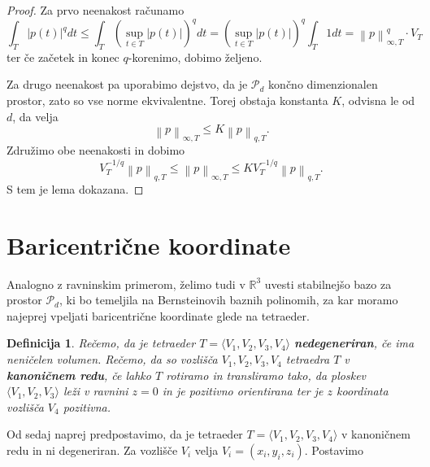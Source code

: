 \documentclass[11pt,a4paper]{article}
\newtheorem{definition}{Definicija}
\newtheorem{theorem}{Izrek}
\begin{document}
\begin{proof}
    Za prvo neenakost računamo
    \begin{equation*}
        \int_{T} |p(t)|^q dt \le 
        \int_{T} \left( \sup_{t \in T} |p(t)| \right) ^q dt
        = \left( \sup_{t \in T} |p(t)| \right)^q \int_{T}1dt
        = \left\lVert p \right\rVert_{\infty , T}^{q} \cdot V_T
    \end{equation*}
    ter če začetek in konec $q$-korenimo, dobimo željeno.

    Za drugo neenakost pa uporabimo dejstvo, da je $\mathcal{P}_d$ končno dimenzionalen prostor, zato so vse norme ekvivalentne. Torej obstaja konstanta $K$, odvisna le od $d$, da velja
    \begin{equation*}
        \left\lVert p \right\rVert_{\infty, T} \leq K \left\lVert p \right\rVert_{q,T}.
    \end{equation*}
    Združimo obe neenakosti in dobimo
    \begin{equation*}
        V_T^{-1/q} \left\lVert p \right\rVert_{q,T} \leq  \left\lVert p \right\rVert_{\infty, T} \leq K V_T^{-1/q} \left\lVert p \right\rVert_{q,T}.
    \end{equation*}
    S tem je lema dokazana.
\end{proof}


\section{Baricentrične koordinate}

Analogno z ravninskim primerom, želimo tudi 
v $\mathbb{R}^3$ uvesti stabilnejšo bazo za prostor 
$\mathcal{P}_d$, ki bo temeljila na Bernsteinovih baznih polinomih,
za kar moramo najeprej vpeljati baricentrične koordinate glede na
tetraeder.

\begin{definition}
    Rečemo, da je tetraeder $T = \langle V_1, V_2, V_3, V_4 \rangle$ \textbf{nedegeneriran}, če ima neničelen volumen. Rečemo, da so vozlišča $V_1 , V_2 , V_3, V_4$ tetraedra $T$ v \textbf{kanoničnem redu}, če lahko $T$ rotiramo in transliramo  tako, da ploskev $\langle V_1, V_2, V_3\rangle$ leži v ravnini $z = 0$ in je pozitivno orientirana ter je $z$ koordinata vozlišča $V_4$ pozitivna.
\end{definition}

Od sedaj naprej predpostavimo, da je tetraeder $T = \langle V_1, V_2, V_3,V_4 \rangle$ v kanoničnem redu in ni degeneriran. 
Za vozlišče $V_i$ velja $V_i = (x_i, y_i, z_i)$. Postavimo 
\end{document}

